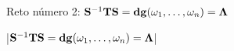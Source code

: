 

\bigskip

\enunciadoS Reto n\'umero 2: 
${\bf S^{\rm -1}TS=dg}(\omega_1,\dots,\omega_n)=\bf\Lambda$

\bigskip

\respuestaS

|${\bf S^{\rm -1}TS=dg}(\omega_1,\dots,\omega_n)=\bf\Lambda$|
\bye

